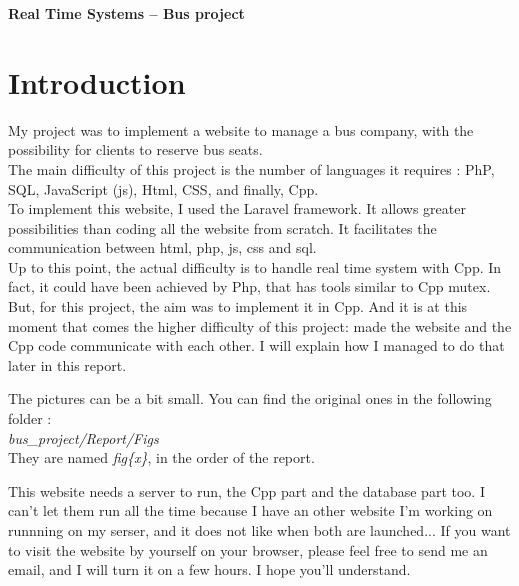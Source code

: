 \documentclass[12pt,a4paper,openany]{book}
\begin{document}
\begin{tcolorbox}[arc=1ex, left=3pt, right=3pt, top=3pt, bottom=2pt]
  \center \LARGE \textbf{Real Time Systems -- Bus project}
\end{tcolorbox}
\bigskip
\section*{Introduction}
\hspace*{0.6cm}My project was to implement a website to manage a bus company, with the possibility for clients to reserve bus seats.\\

The main difficulty of this project is the number of languages it requires : PhP, SQL, JavaScript (js), Html, CSS, and finally, Cpp.\\

To implement this website, I used the Laravel framework. It allows greater possibilities than coding all the website from scratch. It facilitates the communication between html, php, js, css and sql.\\

Up to this point, the actual difficulty is to handle real time system with Cpp. In fact, it could have been achieved by Php, that has tools similar to Cpp mutex. But, for this project, the aim was to implement it in Cpp. And it is at this moment that comes the higher difficulty of this project: made the website and the Cpp code communicate with each other. I will explain how I managed to do that later in this report.

\begin{remarque}
	The pictures can be a bit small. You can find the original ones in the following folder :\\
	\emph{bus\_project/Report/Figs}\\
	They are named \emph{fig\{x\}}, in the order of the report.
\end{remarque}

\begin{remarque}
	This website needs a server to run, the Cpp part and the database part too. I can't let them run all the time because I have an other website I'm working on runnning on my serser, and it does not like when both are launched... If you want to visit the website by yourself on your browser, please feel free to send me an email, and I will turn it on a few hours. I hope you'll understand.
\end{remarque}
\end{document}
